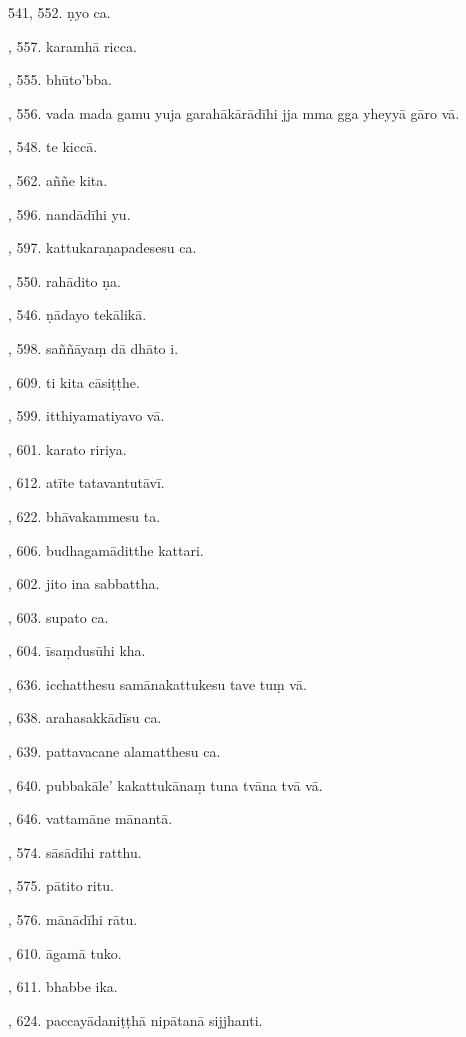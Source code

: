541, 552. ṇyo ca.\par {}, 557. karamhā ricca.\par {}, 555. bhūto’bba.\par {}, 556. vada mada gamu yuja garahākārādīhi jja mma gga yheyyā gāro vā.\par {}, 548. te kiccā.\par {}, 562. aññe kita.\par {}, 596. nandādīhi yu.\par {}, 597. kattukaraṇapadesesu ca.\par {}, 550. rahādito ṇa.\par {}, 546. ṇādayo tekālikā.\par {}, 598. saññāyaṃ dā dhāto i.\par {}, 609. ti kita cāsiṭṭhe.\par {}, 599. itthiyamatiyavo vā.\par {}, 601. karato ririya.\par {}, 612. atīte tatavantutāvī.\par {}, 622. bhāvakammesu ta.\par {}, 606. budhagamāditthe kattari.\par {}, 602. jito ina sabbattha.\par {}, 603. supato ca.\par {}, 604. īsaṃdusūhi kha.\par {}, 636. icchatthesu samānakattukesu tave tuṃ vā.\par {}, 638. arahasakkādīsu ca.\par {}, 639. pattavacane alamatthesu ca.\par {}, 640. pubbakāle’ kakattukānaṃ tuna tvāna tvā vā.\par {}, 646. vattamāne mānantā.\par {}, 574. sāsādīhi ratthu.\par {}, 575. pātito ritu.\par {}, 576. mānādīhi rātu.\par {}, 610. āgamā tuko.\par {}, 611. bhabbe ika.\par {}, 624. paccayādaniṭṭhā nipātanā sijjhanti.\par \noindent
